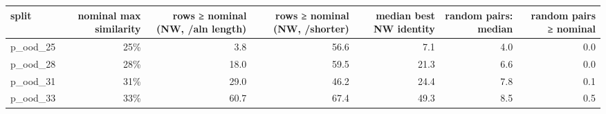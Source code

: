 \begin{tabular}{lrrrrrr}
\toprule
split & nominal max similarity & rows ≥ nominal (NW, /aln length) & rows ≥ nominal (NW, /shorter) & median best NW identity & random pairs: median & random pairs ≥ nominal \\ \midrule
p\_ood\_25 & 25\% & 3.8 & 56.6 & 7.1 & 4.0 & 0.0 \\
p\_ood\_28 & 28\% & 18.0 & 59.5 & 21.3 & 6.6 & 0.0 \\
p\_ood\_31 & 31\% & 29.0 & 46.2 & 24.4 & 7.8 & 0.1 \\
p\_ood\_33 & 33\% & 60.7 & 67.4 & 49.3 & 8.5 & 0.5 \\
\bottomrule
\end{tabular}
